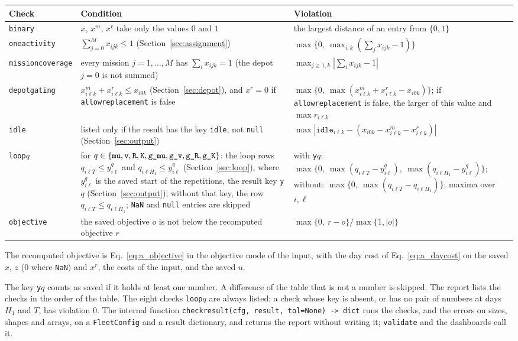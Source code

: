 \documentclass[11pt,a4paper]{article}
\makeatletter
\theoremstyle{plain}
\theoremstyle{definition}
\renewcommand{\_}{\textunderscore\allowbreak{}}
\providecommand{\typerow}[3]{{\raggedright #1\par} & {\raggedright #2\par} & {\raggedright #3\par} \\}
\providecommand{\tabstart}[2]{\begingroup\small\begin{longtable}{@{}#1@{}}\toprule #2 \\ \midrule \endhead}
\providecommand{\tabend}{\bottomrule\end{longtable}\endgroup}
\makeatother
\begin{document}
\tabstart{p{2.6cm}p{7.2cm}p{5.2cm}}{Check & Condition & Violation}
\typerow{\texttt{binary}}{$x$, $x^m$, $x^r$ take only the values $0$ and $1$}{the largest distance of an entry from $\{0,1\}$}
\typerow{\texttt{one\_activity}}{$\sum_{j=0}^{M} x_{ijk} \leq 1$ (Section~\ref{sec:assignment})}{$\max\{0,\ \max_{i,k}(\sum_j x_{ijk} - 1)\}$}
\typerow{\texttt{mission\_coverage}}{every mission $j = 1,\ldots,M$ has $\sum_{i} x_{ijk} = 1$ (the depot $j = 0$ is not summed)}{$\max_{j \geq 1,k} |\sum_i x_{ijk} - 1|$}
\typerow{\texttt{depot\_gating}}{$x^m_{i\ell k} + x^r_{i\ell k} \leq x_{i0k}$ (Section~\ref{sec:depot}), and $x^r = 0$ if \texttt{allow\_replacement} is false}{$\max\{0,\ \max(x^m_{i\ell k} + x^r_{i\ell k} - x_{i0k})\}$; if \texttt{allow\_replacement} is false, the larger of this value and $\max r_{i\ell k}$}
\typerow{\texttt{idle}}{listed only if the result has the key \texttt{idle}, not \texttt{null} (Section~\ref{sec:output})}{$\max |\texttt{idle}_{i\ell k} - (x_{i0k} - x^m_{i\ell k} - x^r_{i\ell k})|$}
\typerow{\texttt{loop\_}$q$}{for $q \in \{\texttt{mu}, \texttt{v}, \texttt{R}, \texttt{K}, \texttt{g\_mu}, \texttt{g\_v}, \texttt{g\_R}, \texttt{g\_K}\}$: the loop rows $q_{i\ell T} \leq y^q_{i\ell}$ and $q_{i\ell H_1} \leq y^q_{i\ell}$ (Section~\ref{sec:loop}), where $y^q_{i\ell}$ is the saved start of the repetitions, the result key \texttt{y\_}$q$ (Section~\ref{sec:output}); without that key, the row $q_{i\ell T} \leq q_{i\ell H_1}$; \texttt{NaN} and \texttt{null} entries are skipped}{with \texttt{y\_}$q$: $\max\{0,\ \max(q_{i\ell T} - y^q_{i\ell}),\ \max(q_{i\ell H_1} - y^q_{i\ell})\}$; without: $\max\{0,\ \max(q_{i\ell T} - q_{i\ell H_1})\}$; maxima over $i,\ell$}
\typerow{\texttt{objective}}{the saved objective $o$ is not below the recomputed objective $r$}{$\max\{0,\ r - o\}/\max\{1, |o|\}$}
\tabend

The recomputed objective is Eq.~\eqref{eq:a_objective} in the objective mode of the input, with the day cost of Eq.~\eqref{eq:a_daycost} on the saved $x$, $z$ ($0$ where \texttt{NaN}) and $x^r$, the costs of the input, and the saved $u$.

The key \texttt{y\_}$q$ counts as saved if it holds at least one number. A difference of the table that is not a number is skipped. The report lists the checks in the order of the table. The eight checks \texttt{loop\_}$q$ are always listed; a check whose key is absent, or has no pair of numbers at days $H_1$ and $T$, has violation $0$. The internal function \texttt{check\_result(cfg, result, tol=None) -> dict} runs the checks, and the errors on sizes, shapes and arrays, on a \texttt{FleetConfig} and a result dictionary, and returns the report without writing it; \texttt{validate} and the dashboards call it.
\end{document}
